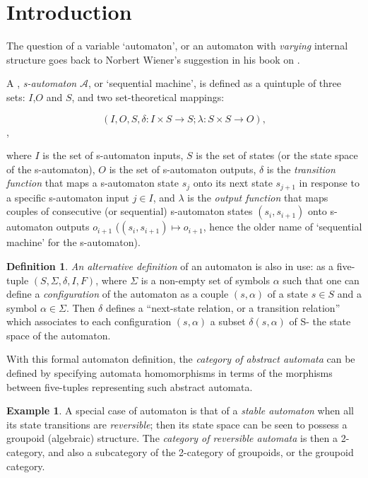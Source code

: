 \documentclass[12pt]{article}
\theoremstyle{plain}
\theoremstyle{definition}
\newtheorem{definition}{Definition}[section]
\newtheorem{example}{Example}[section]
\numberwithin{equation}{section}
\newcommand{\A}{\mathcal A}
\begin{document}
\section{Introduction}
 The question of a variable `automaton', or an automaton with {\em varying} internal structure goes back to Norbert Wiener's suggestion in his book on . 

 A , {\em s-automaton} $\A$, or `sequential machine', is defined as a quintuple of three sets: $I$,$O$ and $S$, and two set-theoretical mappings:

$$(I, O, S, \delta: I \times S \rightarrow S; \lambda: S \times S \rightarrow O),$$,

where $I$ is the set of s-automaton inputs, $S$ is the set of states (or the state space of the s-automaton), $O$ is the set of s-automaton outputs, $\delta$ is the {\em transition function} that maps a s-automaton state $s_j$ onto its next state $s_{j+1}$ in response to a specific s-automaton input $j \in I$, and $\lambda$ is the {\em output function} that maps couples of consecutive (or sequential) s-automaton states $(s_i, s_{i+1})$ onto s-automaton outputs 
$o_{i+1}$  ($(s_i, s_{i+1}) \mapsto o_{i+1}$, hence the older name of `sequential machine' for the s-automaton).

\bigbreak

\begin{definition} {\em An alternative definition} of an automaton is also in use:
as a five-tuple $(S, \Sigma, \delta, I, F)$, where $\Sigma$ is a non-empty set of symbols
$\alpha$ such that one can define a {\em configuration} of the automaton as a couple
$(s,\alpha)$ of a state $s \in S $ and a symbol $\alpha \in \Sigma $. Then $\delta$
defines a ``next-state relation, or a transition relation'' which associates to each configuration
$(s, \alpha)$ a subset $\delta (s,\alpha)$ of S- the state space of the automaton.

\bigbreak

With this formal automaton definition, the \emph{category of abstract automata} can be defined by specifying automata homomorphisms in terms of the morphisms between five-tuples representing such abstract automata.
\end{definition}

\bigbreak

\begin{example} A special case of automaton is that of a {\em stable automaton} when all its state transitions are {\em reversible}; then its state space can be seen to possess a groupoid (algebraic) structure. The {\em category of reversible automata} is then a 2-category, and also a subcategory of the 2-category of groupoids, or the groupoid category. \end{example}
\end{document}
